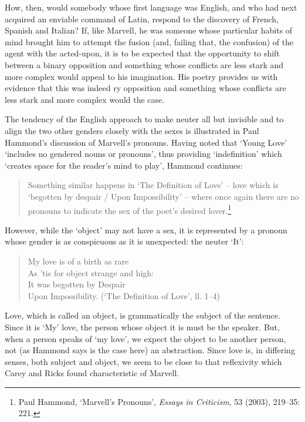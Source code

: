 ﻿\documentclass[12pt]{article}
\newcommand{\citedtitle}[1]{\textit{#1}}
\begin{document}
How,
then, would somebody whose first language was English, and who had next
acquired an enviable command of Latin, respond to the discovery of French,
Spanish and Italian? If, like Marvell, he was someone whose particular habits
of mind brought him to attempt the fusion (and, failing that, the confusion) of
the agent with the acted-upon, it is to be expected that the opportunity to
shift between a binary opposition and something whose conflicts are less stark and more complex would appeal to his imagination. His poetry provides us with
evidence that this was indeed ry opposition and something whose conflicts are
less stark and more complex would the case.

The
tendency of the English approach to make neuter all but invisible and to align
the two other genders closely with the sexes is illustrated in Paul Hammond’s
discussion of Marvell’s pronouns. Having noted that ‘Young Love’ ‘includes no
gendered nouns or pronouns’, thus providing ‘indefinition’ which ‘creates space
for the reader’s mind to play’, Hammond continues:

\begin{quote}
Something
similar happens in ‘The Definition of Love’ – love which is ‘begotten by
despair / Upon Impossibility’ – where once again there are no pronouns to
indicate the sex of the poet’s desired lover.\footnote{Paul Hammond,
‘Marvell’s Pronouns’, \citedtitle{Essays in Criticism}, 53 (2003), 219–35:
221.}
\end{quote}
However, while the ‘object’ may not have a sex, it is represented by a pronoun whose
gender is as conspicuous as it is unexpected: the neuter ‘It’:

\begin{verse}My
love is of a birth as rare\\
As ’tis for object strange and high:\\
It was begotten by Despair\\
Upon Impossibility. (‘The Definition of Love’, ll. 1–4)
\end{verse}
Love, which is called an object, is grammatically the subject of the sentence. Since
it is ‘My’ love, the person whose object it is must be the speaker. But, when a
person speaks of ‘my love’, we expect the object to be another person, not (as
Hammond says is the case here) an abstraction. Since love is, in differing
senses, both subject and object, we seem to be close to that reflexivity which
Carey and Ricks found characteristic of Marvell.
\end{document}
